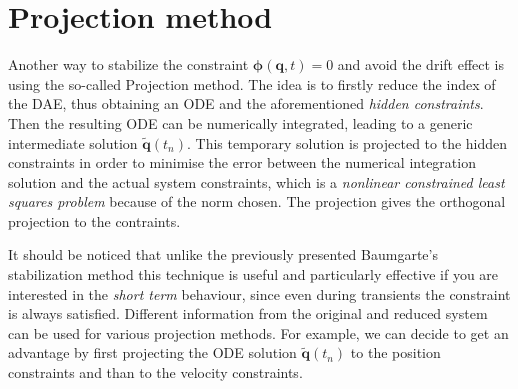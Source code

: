 	\section{Projection method}
	Another way to stabilize the constraint $\bm{\phi}(\bm{q},t)=0$ and avoid the drift effect is using the so-called Projection method. The idea is to firstly reduce the index of the DAE, thus obtaining an ODE and the aforementioned \emph{hidden constraints}. Then the resulting ODE can be numerically integrated, leading to a generic intermediate solution $\widetilde{\bm{q}}(t_n)$. This temporary solution is projected to the hidden constraints in order to minimise the error between the numerical integration solution and the actual system constraints, which is a \textit{nonlinear constrained least squares problem} because of the norm chosen. The projection gives the orthogonal projection to the contraints.

It should be noticed that unlike the previously presented Baumgarte's stabilization method this technique is useful and particularly effective if you are interested in the \emph{short term} behaviour, since even during transients the constraint is always satisfied. Different information from the original and reduced system can be used for various projection methods. For example, we can decide to get an advantage by first projecting the ODE solution $\widetilde{\bm{q}}(t_n)$ to the position constraints and than to the velocity constraints.

